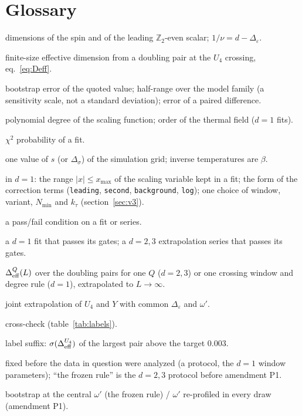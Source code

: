 \documentclass[10pt,a4paper]{article}
\newcommand{\Ds}{\Delta_\sigma}
\newcommand{\De}{\Delta_\varepsilon}
\newcommand{\Deff}{\Delta_{\rm eff}}
\newcommand{\code}[1]{\texttt{#1}}
\newcommand{\sstat}{\sigma_{\rm stat}}
\newcommand{\ssys}{\sigma_{\rm sys}}
\newcommand{\ktau}{k_\tau}
\begin{document}
\section{Glossary}
\begin{description}[leftmargin=1.2em]
\item[$\Ds$, $\De$] dimensions of the spin and of the leading $\mathbb Z_2$-even scalar; $1/\nu=d-\De$.
\item[$\Deff^Q$] finite-size effective dimension from a doubling pair at the $U_4$ crossing, eq.~\eqref{eq:Deff}.
\item[$\sstat$, $\ssys$, $\sigma_D$] bootstrap error of the quoted value; half-range over the model family (a sensitivity scale, not a standard
 deviation); error of a paired difference.
\item[$p$, $\ktau$] polynomial degree of the scaling function; order of the thermal field ($d=1$ fits).
\item[$P_{\chi^2}$] $\chi^2$ probability of a fit.
\item[coupling] one value of $s$ (or $\Ds$) of the simulation grid; inverse temperatures are $\beta$.
\item[window, variant, configuration] in $d=1$: the range $|x|\le x_{\max}$ of the scaling variable kept in a fit; the form of the correction
 terms (\code{leading}, \code{second}, \code{background}, \code{log}); one choice of window, variant, $N_{\min}$ and $\ktau$
 (section~\ref{sec:v3}).
\item[gate] a pass/fail condition on a fit or series.
\item[quotable, eligible] a $d=1$ fit that passes its gates; a $d=2,3$ extrapolation series that passes its gates.
\item[series] $\Deff^Q(L)$ over the doubling pairs for one $Q$ ($d=2,3$) or one crossing window and degree rule ($d=1$), extrapolated to
 $L\to\infty$.
\item[U4+Y] joint extrapolation of $U_4$ and $Y$ with common $\De$ and $\omega'$.
\item[x-check] cross-check (table~\ref{tab:labels}).
\item[{[$\sigma$]}] label suffix: $\sigma(\Deff^{U_4})$ of the largest pair above the target 0.003.
\item[frozen] fixed before the data in question were analyzed (a protocol, the $d=1$ window parameters); ``the frozen rule'' is the
 $d=2,3$ protocol before amendment P1.
\item[fixed-$\omega'$ / profiled rule] bootstrap at the central $\omega'$ (the frozen rule) / $\omega'$ re-profiled in every draw (amendment P1).

\end{description}
\end{document}

